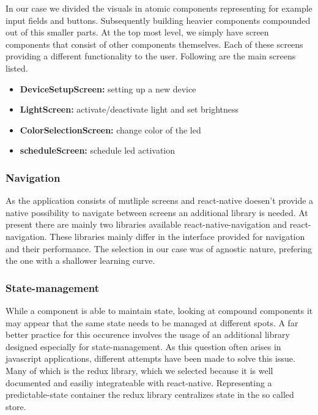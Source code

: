 \documentclass[conference]{IEEEtran}
\begin{document}
In our case we divided the visuals in atomic components representing for example input fields and buttons. Subsequently building
heavier components compounded out of this smaller parts. At the top most level, we simply have screen components that consist of 
other components themselves. Each of these screens providing a different functionality to the user. Following are the main screens
listed.

\begin{itemize}
    \item \textbf{DeviceSetupScreen:} setting up a new device
    \item \textbf{LightScreen:} activate/deactivate light and set brightness
    \item \textbf{ColorSelectionScreen:} change color of the led
    \item \textbf{scheduleScreen:} schedule led activation 
\end{itemize}
\vspace{5pt}


\subsubsection{Navigation}
As the application consists of mutliple screens and react-native doesen't provide a native possibility to navigate between screens an 
additional library is needed. At present there are mainly two libraries available react-native-navigation and react-navigation. These
libraries mainly differ in the interface provided for navigation and their performance. The selection in our case was of agnostic nature,
prefering the one with a shallower learning curve. 

\subsubsection{State-management}
While a component is able to maintain state, looking at compound components it may appear that the same state needs to be managed at
different spots. A far better practice for this occurence involves the usage of an additional library designed especially for 
state-management. As this question often arises in javascript applications, different attempts have been made to solve this issue.
Many of which is the redux library, which we selected because it is well documented and easiliy integrateable with react-native.
Representing a predictable-state container the redux library centralizes state in the so called store. 
\end{document}
